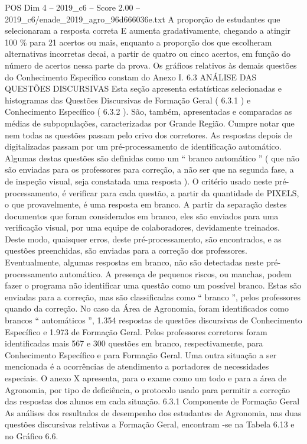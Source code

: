 \begin{textsample}{POS Dim 4 – 2019\_c6 – Score 2.00 – 2019\_c6/enade\_2019\_agro\_96d666036e.txt}
A proporção de estudantes que selecionaram a resposta correta E aumenta gradativamente, chegando a atingir 100 \% para 21 acertos ou mais, enquanto a proporção dos que escolheram alternativas incorretas decai, a partir de quatro ou cinco acertos, em função do número de acertos nessa parte da prova.
Os gráficos relativos às demais questões do Conhecimento Específico constam do Anexo I. 6.3 ANÁLISE DAS QUESTÕES DISCURSIVAS Esta seção apresenta estatísticas selecionadas e histogramas das Questões Discursivas de Formação Geral ( 6.3.1 ) e Conhecimento Específico ( 6.3.2 ).
São, também, apresentadas e comparadas as médias de subpopulações, caracterizadas por Grande Região.
Cumpre notar que nem todas as questões passam pelo crivo dos corretores.
As respostas depois de digitalizadas passam por um pré-processamento de identificação automático.
Algumas destas questões são definidas como um “ branco automático ” ( que não são enviadas para os professores para correção, a não ser que na segunda fase, a de inspeção visual, seja constatada uma resposta ).
O critério usado neste pré-processamento, é verificar para cada questão, a partir da quantidade de PIXELS, o que provavelmente, é uma resposta em branco.
A partir da separação destes documentos que foram considerados em branco, eles são enviados para uma verificação visual, por uma equipe de colaboradores, devidamente treinados.
Deste modo, quaisquer erros, deste pré-processamento, são encontrados, e as questões preenchidas, são enviadas para a correção dos professores.
Eventualmente, algumas respostas em branco, não são detectadas neste pré-processamento automático.
A presença de pequenos riscos, ou manchas, podem fazer o programa não identificar uma questão como um possível branco.
Estas são enviadas para a correção, mas são classificadas como “ branco ”, pelos professores quando da correção.
No caso da Área de Agronomia, foram identificados como brancos “ automáticos ”, 1.354 respostas de questões discursivas de Conhecimento Específico e 1.973 de Formação Geral.
Pelos professores corretores foram identificadas mais 567 e 300 questões em branco, respectivamente, para Conhecimento Específico e para Formação Geral.
Uma outra situação a ser mencionada é a ocorrências de atendimento a portadores de necessidades especiais.
O anexo X apresenta, para o exame como um todo e para a área de Agronomia, por tipo de deficiência, o protocolo usado para permitir a correção das respostas dos alunos em cada situação. 6.3.1 Componente de Formação Geral As análises dos resultados de desempenho dos estudantes de Agronomia, nas duas questões discursivas relativas a Formação Geral, encontram -se na Tabela 6.13 e no Gráfico 6.6.

\end{textsample}
